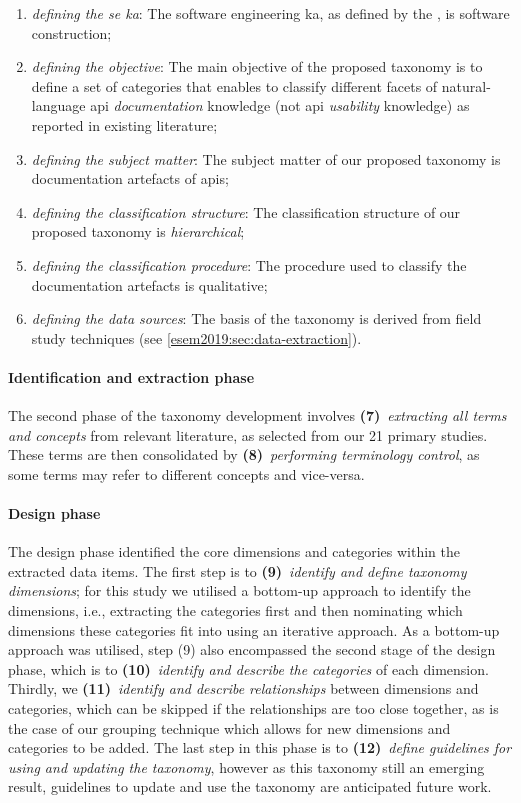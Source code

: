 \begin{enumerate}[label=\textbf{(\arabic*)}]
  \item \textit{defining the \gls{se} \gls{ka}}: The software engineering \gls{ka}, as defined by the , is software construction;
  \item \textit{defining the objective}: The main objective of the proposed taxonomy is to define a set of categories that enables to classify different facets of natural-language \gls{api} \textit{documentation} knowledge (not \gls{api} \textit{usability} knowledge) as reported in existing literature;
  \item \textit{defining the subject matter}: The subject matter of our proposed taxonomy is  documentation artefacts of \glspl{api};
  \item \textit{defining the classification structure}: The classification structure of our  proposed taxonomy is \textit{hierarchical};
  \item \textit{defining the classification procedure}: The procedure used to classify the documentation artefacts is qualitative; 
  \item \textit{defining the data sources}: The basis of the taxonomy is derived from field study techniques (see \cref{esem2019:sec:data-extraction}).
\end{enumerate}

\paragraph{Identification and extraction phase} The second phase of the taxonomy development involves \textbf{(7)}~\textit{extracting all terms and concepts} from relevant literature, as selected from our 21 primary studies. These terms are then consolidated by \textbf{(8)}~\textit{performing terminology control}, as some terms may refer to different concepts and vice-versa.

\paragraph{Design phase} The design phase identified the core dimensions and categories within the extracted data items. The first step is to \textbf{(9)}~\textit{identify and define taxonomy dimensions}; for this study we utilised a bottom-up approach to identify the dimensions, i.e., extracting the categories first and then nominating which dimensions these categories fit into using an iterative approach. As a bottom-up approach was utilised, step (9) also encompassed the second stage of the design phase, which is to \textbf{(10)}~\textit{identify and describe the categories} of each dimension. Thirdly, we \textbf{(11)}~\textit{identify and describe relationships} between dimensions and categories, which can be skipped if the relationships are too close together, as is the case of our grouping technique which allows for new dimensions and categories to be added. The last step in this phase is to \textbf{(12)}~\textit{define guidelines for using and updating the taxonomy}, however as this taxonomy still an emerging result, guidelines to update and use the taxonomy are anticipated future work.

